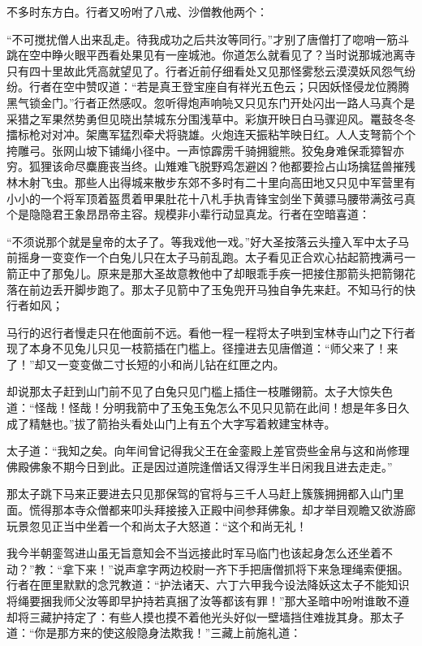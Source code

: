 \documentclass[12pt,UTF8]{ctexbook}
\begin{document}
不多时东方白。行者又吩咐了八戒、沙僧教他两个：

“不可搅扰僧人出来乱走。待我成功之后共汝等同行。”才别了唐僧打了唿哨一筋斗跳在空中睁火眼平西看处果见有一座城池。你道怎么就看见了？当时说那城池离寺只有四十里故此凭高就望见了。行者近前仔细看处又见那怪雾愁云漠漠妖风怨气纷纷。行者在空中赞叹道：“若是真王登宝座自有祥光五色云；只因妖怪侵龙位腾腾黑气锁金门。”行者正然感叹。忽听得炮声响喨又只见东门开处闪出一路人马真个是采猎之军果然势勇但见晓出禁城东分围浅草中。彩旗开映日白马骤迎风。鼍鼓冬冬擂标枪对对冲。架鹰军猛烈牵犬将骁雄。火炮连天振粘竿映日红。人人支弩箭个个挎雕弓。张网山坡下铺绳小径中。一声惊霹雳千骑拥貔熊。狡兔身难保乖獐智亦穷。狐狸该命尽麋鹿丧当终。山雉难飞脱野鸡怎避凶？他都要捡占山场擒猛兽摧残林木射飞虫。那些人出得城来散步东郊不多时有二十里向高田地又只见中军营里有小小的一个将军顶着盔贯着甲果肚花十八札手执青锋宝剑坐下黄骠马腰带满弦弓真个是隐隐君王象昂昂帝主容。规模非小辈行动显真龙。行者在空暗喜道：

“不须说那个就是皇帝的太子了。等我戏他一戏。”好大圣按落云头撞入军中太子马前摇身一变变作一个白兔儿只在太子马前乱跑。太子看见正合欢心拈起箭拽满弓一箭正中了那兔儿。原来是那大圣故意教他中了却眼乖手疾一把接住那箭头把箭翎花落在前边丢开脚步跑了。那太子见箭中了玉兔兜开马独自争先来赶。不知马行的快行者如风；

马行的迟行者慢走只在他面前不远。看他一程一程将太子哄到宝林寺山门之下行者现了本身不见兔儿只见一枝箭插在门槛上。径撞进去见唐僧道：“师父来了！来了！”却又一变变做二寸长短的小和尚儿钻在红匣之内。

却说那太子赶到山门前不见了白兔只见门槛上插住一枝雕翎箭。太子大惊失色道：“怪哉！怪哉！分明我箭中了玉兔玉兔怎么不见只见箭在此间！想是年多日久成了精魅也。”拔了箭抬头看处山门上有五个大字写着敕建宝林寺。

太子道：“我知之矣。向年间曾记得我父王在金銮殿上差官赍些金帛与这和尚修理佛殿佛象不期今日到此。正是因过道院逢僧话又得浮生半日闲我且进去走走。”

那太子跳下马来正要进去只见那保驾的官将与三千人马赶上簇簇拥拥都入山门里面。慌得那本寺众僧都来叩头拜接接入正殿中间参拜佛象。却才举目观瞻又欲游廊玩景忽见正当中坐着一个和尚太子大怒道：“这个和尚无礼！

我今半朝銮驾进山虽无旨意知会不当远接此时军马临门也该起身怎么还坐着不动？”教：“拿下来！”说声拿字两边校尉一齐下手把唐僧抓将下来急理绳索便捆。行者在匣里默默的念咒教道：“护法诸天、六丁六甲我今设法降妖这太子不能知识将绳要捆我师父汝等即早护持若真捆了汝等都该有罪！”那大圣暗中吩咐谁敢不遵却将三藏护持定了：有些人摸也摸不着他光头好似一壁墙挡住难拢其身。那太子道：“你是那方来的使这般隐身法欺我！”三藏上前施礼道：
\end{document}
